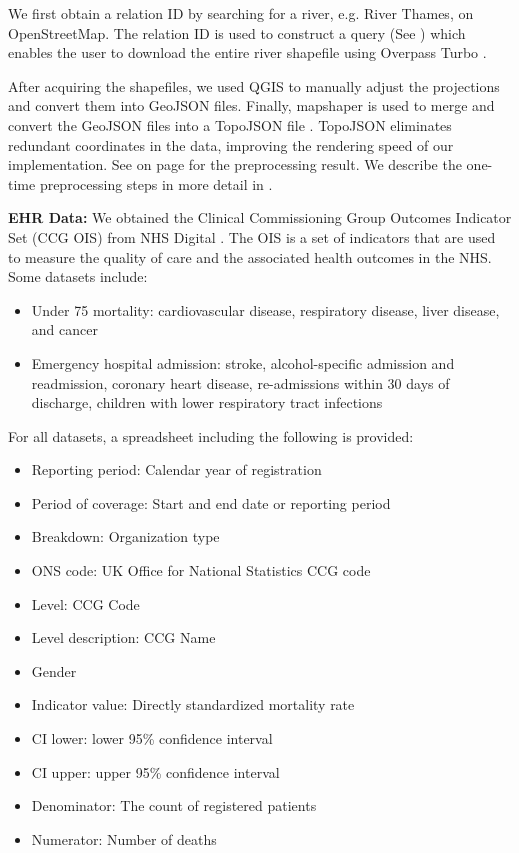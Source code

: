 \documentclass[Afour,sagev,times]{sagej}
\newcommand{\bobgraph}[1]{\noindent\textbf{#1}}
\begin{document}
We first obtain a relation ID by searching for a river, e.g. River Thames, on OpenStreetMap. The relation ID is used to construct a query (See ) which enables the user to download the entire river shapefile using Overpass Turbo \cite{overpassturboOverpass}.

After acquiring the shapefiles, we used QGIS \cite{qgisWelcome} to manually adjust the projections and convert them into GeoJSON files. Finally, mapshaper \cite{blochMapshaper} is used to merge and convert the GeoJSON files into a TopoJSON file \cite{TopoJSON}. TopoJSON eliminates redundant coordinates in the data, improving the rendering speed of our implementation. See  on page \pageref{table:pre-processing_result} for the preprocessing result. We describe the one-time preprocessing steps in more detail in .

\bobgraph{EHR Data: }We obtained the Clinical Commissioning Group Outcomes Indicator Set (CCG OIS) from NHS Digital \cite{nhsdigitalClinical}. The OIS is a set of indicators that are used to measure the quality of care and the associated health outcomes in the NHS. Some datasets include:
\begin{itemize}
    \setlength\itemsep{0px}
    \item Under 75 mortality: cardiovascular disease, respiratory disease, liver disease, and cancer
    \item Emergency hospital admission: stroke, alcohol-specific admission and readmission, coronary heart disease, re-admissions within 30 days of discharge, children with lower respiratory tract infections
\end{itemize}

For all datasets, a spreadsheet including the following is provided:

\begin{itemize}
    \setlength\itemsep{0px}
    \item Reporting period: Calendar year of registration
    \item Period of coverage: Start and end date or reporting period
    \item Breakdown: Organization type
    \item ONS code: UK Office for National Statistics CCG code
    \item Level: CCG Code
    \item Level description: CCG Name
    \item Gender
    \item Indicator value: Directly standardized mortality rate
    \item CI lower: lower 95\% confidence interval
    \item CI upper: upper 95\% confidence interval
    \item Denominator: The count of registered patients
    \item Numerator: Number of deaths
\end{itemize}
\end{document}
